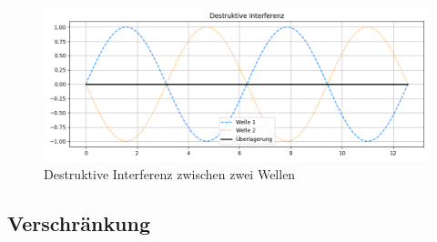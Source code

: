 \begin{figure}[H]
    \centering
    \includegraphics[width=1\linewidth]{images/physics/Interferenz_Destruktiv.png}
    \caption{Destruktive Interferenz zwischen zwei Wellen}
    \label{fig:Interferenz_Destruktiv}
\end{figure}

\subsection{Verschränkung }
\label{sec: Verschränkung}

